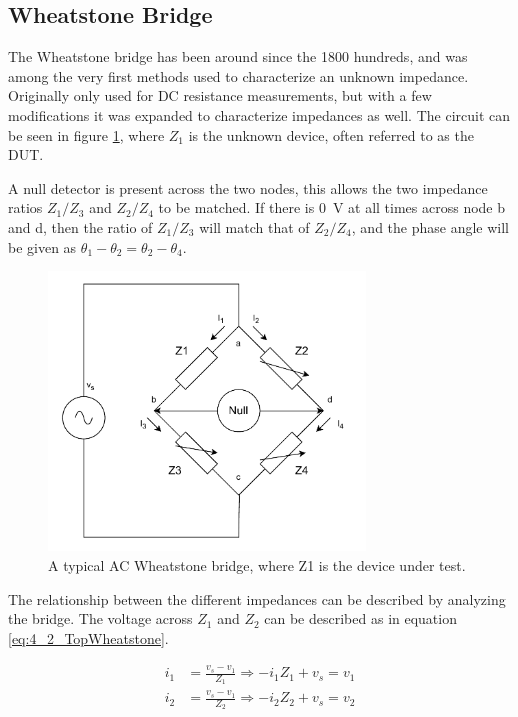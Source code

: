 \subsection{Wheatstone Bridge} \label{ssec:BridgeCircuits}
The Wheatstone bridge has been around since the 1800 hundreds, and was among the very first methods used to characterize an unknown impedance. Originally only used for DC resistance measurements, but with a few modifications it was expanded to characterize impedances as well. 
The circuit can be seen in figure \ref{fig_4_2_WheatstoneBridge}, where $Z_1$ is the unknown device,
 often referred to as the DUT.
 
A null detector is present across the two nodes, this allows the two impedance ratios $Z_1/Z_3$ and $Z_2/Z_4$
to be matched. If there is \SI{0}{\volt} at all times across node b and d, then the ratio of $Z_1/Z_3$ will match that of
 $Z_2/Z_4$, and the
phase angle will be given as $\theta_1 - \theta_2 = \theta_2 - \theta_4$. 

\begin{figure}[H]
    \centering
    \includegraphics[width=0.75\textwidth]{Sections/4_TechnicalAnalysis/Figures_JFT/WheatstoneBridgeAC.pdf}
    \caption{A typical AC Wheatstone bridge, where Z1 is the device under test.}
    \label{fig_4_2_WheatstoneBridge}
\end{figure}

The relationship between the different impedances can be described by analyzing the bridge. The voltage across $Z_1$ and $Z_2$ can
be described as in equation \ref*{eq:4_2_TopWheatstone}.

\begin{equation}
    \begin{split}
        \label{eq:4_2_TopWheatstone}
        i_1 &= \frac{v_s-v_1}{Z_1} \Rightarrow -i_1 Z_1 +v_s = v_1 \\
        i_2 &= \frac{v_s-v_1}{Z_2} \Rightarrow -i_2 Z_2 + v_s = v_2
    \end{split}
\end{equation}

